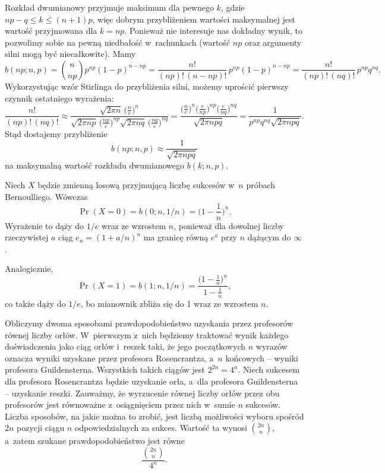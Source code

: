 \exercise %
Rozkład dwumianowy przyjmuje maksimum dla pewnego $k$, gdzie $np-q\le k\le(n+1)p$, więc dobrym przybliżeniem wartości maksymalnej jest wartość przyjmowana dla $k=np$.
Ponieważ nie interesuje nas dokładny wynik, to pozwolimy sobie na pewną niedbałość w~rachunkach (wartość $np$ oraz argumenty silni mogą być niecałkowite).
Mamy
\[
	b(np;n,p) = \binom{n}{np}p^{np}(1-p)^{n-np} = \frac{n!}{(np)!\,(n-np)!}\,p^{np}(1-p)^{n-np} = \frac{n!}{(np)!\,(nq)!}\,p^{np}q^{nq}.
\]
Wykorzystując wzór Stirlinga do przybliżenia silni, możemy uprościć pierwszy czynnik ostatniego wyrażenia:
\[
	\frac{n!}{(np)!\,(nq)!} \approx \frac{\sqrt{2\pi n}\,\bigl(\frac{n}{e}\bigr)^n}{\sqrt{2\pi np}\,\bigl(\frac{np}{e}\bigr)^{np}\sqrt{2\pi nq}\,\bigl(\frac{nq}{e}\bigr)^{nq}} = \frac{\bigl(\frac{n}{e}\bigr)^n\bigl(\frac{e}{np}\bigr)^{np}\bigl(\frac{e}{nq}\bigr)^{nq}}{\sqrt{2\pi npq}} = \frac{1}{p^{np}q^{nq}\sqrt{2\pi npq}}.
\]
Stąd dostajemy przybliżenie
\[
	b(np;n,p) \approx \frac{1}{\sqrt{2\pi npq}}
\]
na maksymalną wartość rozkładu dwumianowego $b(k;n,p)$.

\exercise %
Niech $X$ będzie zmienną losową przyjmującą liczbę sukcesów w~$n$ próbach Bernoulliego.
Wówczas
\[
	\Pr(X=0) = b(0;n,1/n) = \biggl(1-\frac{1}{n}\biggr)^n.
\]
Wyrażenie to dąży do $1/e$ wraz ze wzrostem $n$, ponieważ dla dowolnej liczby rzeczywistej $a$ ciąg $e_n={(1+a/n)}^n$ ma granicę równą $e^a$ przy $n$ dążącym do $\infty$.

Analogicznie,
\[
	\Pr(X=1) = b(1;n,1/n) = \frac{\bigl(1-\frac{1}{n}\bigr)^n}{1-\frac{1}{n}},
\]
co także dąży do $1/e$, bo mianownik zbliża się do 1 wraz ze wzrostem $n$.

\exercise %
Obliczymy dwoma sposobami prawdopodobieństwo uzyskania przez profesorów równej liczby orłów.
W~pierwszym z~nich będziemy traktować wynik każdego doświadczenia jako  ciąg orłów i~reszek taki, że jego początkowych $n$ wyrazów oznacza wyniki uzyskane przez profesora Rosencrantza, a~$n$ końcowych -- wyniki profesora Guildensterna.
Wszystkich takich ciągów jest $2^{2n}=4^n$.
Niech sukcesem dla profesora Rosencrantza będzie uzyskanie orła, a~dla profesora Guildensterna -- uzyskanie reszki.
Zauważmy, że wyrzucenie równej liczby orłów przez obu profesorów jest równoważne z~osiągnięciem przez nich w~sumie $n$ sukcesów.
Liczba sposobów, na jakie można to zrobić, jest liczbą możliwości wyboru spośród $2n$ pozycji ciągu $n$ odpowiedzialnych za sukces.
Wartość ta wynosi $\binom{2n}{n}$, a~zatem szukane prawdopodobieństwo jest równe
\[
	\frac{\binom{2n}{n}}{4^n}.
\]

